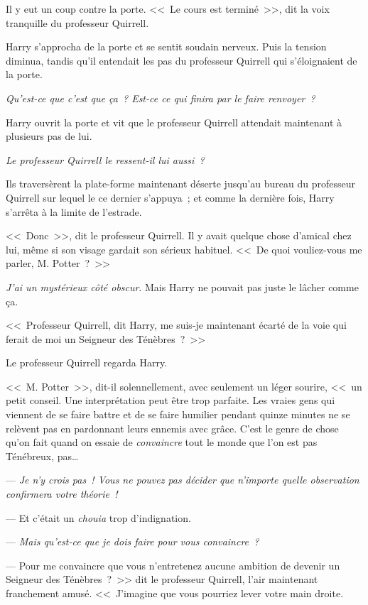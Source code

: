 Il y eut un coup contre la porte. <<~Le cours est terminé~>>, dit la voix tranquille du professeur Quirrell.

Harry s'approcha de la porte et se sentit soudain nerveux. Puis la tension diminua, tandis qu'il entendait les pas du professeur Quirrell qui s'éloignaient de la porte.

\emph{Qu'est-ce que c'est que ça~? Est-ce ce qui finira par le faire renvoyer~?}

Harry ouvrit la porte et vit que le professeur Quirrell attendait maintenant à plusieurs pas de lui.

\emph{Le professeur Quirrell le ressent-il lui aussi~?}

Ils traversèrent la plate-forme maintenant déserte jusqu'au bureau du professeur Quirrell sur lequel le ce dernier s'appuya~; et comme la dernière fois, Harry s'arrêta à la limite de l'estrade.

<<~Donc~>>, dit le professeur Quirrell. Il y avait quelque chose d'amical chez lui, même si son visage gardait son sérieux habituel. <<~De quoi vouliez-vous me parler, M. Potter~?~>>

\emph{J'ai un mystérieux côté obscur}. Mais Harry ne pouvait pas juste le lâcher comme ça.

<<~Professeur Quirrell, dit Harry, me suis-je maintenant écarté de la voie qui ferait de moi un Seigneur des Ténèbres~?~>>

Le professeur Quirrell regarda Harry.

<<~M. Potter~>>, dit-il solennellement, avec seulement un léger sourire, <<~un petit conseil. Une interprétation peut être trop parfaite. Les vraies gens qui viennent de se faire battre et de se faire humilier pendant quinze minutes ne se relèvent pas en pardonnant leurs ennemis avec grâce. C'est le genre de chose qu'on fait quand on essaie de \emph{convaincre} tout le monde que l'on est pas Ténébreux, pas…

--- \emph{Je n'y crois pas~! Vous ne pouvez pas décider que n'importe quelle observation confirmera votre théorie~!}

--- Et c'était un \emph{chouia} trop d'indignation.

--- \emph{Mais qu'est-ce que je dois faire pour vous convaincre~?}

--- Pour me convaincre que vous n'entretenez aucune ambition de devenir un Seigneur des Ténèbres~?~>> dit le professeur Quirrell, l'air maintenant franchement amusé. <<~J'imagine que vous pourriez lever votre main droite.

